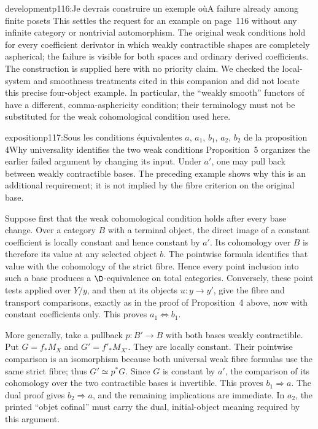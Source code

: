 \begin{dcomment}{development}{p116:Je devrais construire un exemple où}{A failure already among finite posets}
This settles the request for an example on page~116 without any infinite category or nontrivial automorphism. The original weak conditions hold for every coefficient derivator in which weakly contractible shapes are completely aspherical; the failure is visible for both spaces and ordinary derived coefficients. The construction is supplied here with no priority claim. We checked the local-system and smoothness treatments cited in this companion and did not locate this precise four-object example. In particular, the ``weakly smooth'' functors of \citet[Definition~4.1 and Proposition~4.3]{Maltsiniotis2005Asphericite} have a different, comma-asphericity condition; their terminology must not be substituted for the weak cohomological condition used here.
\end{dcomment}

\begin{dcomment}{exposition}{p117:Sous les conditions équivalentes $a$, $a_1$, $b_1$, $a_2$, $b_2$ de la proposition 4}{Why universality identifies the two weak conditions}
Proposition~5 organizes the earlier failed argument by changing its input. Under $a'$, one may pull back between weakly contractible bases. The preceding example shows why this is an additional requirement; it is not implied by the fibre criterion on the original base.

Suppose first that the weak cohomological condition holds after every base change. Over a category $B$ with a terminal object, the direct image of a constant coefficient is locally constant and hence constant by $a'$. Its cohomology over $B$ is therefore its value at any selected object $b$. The pointwise formula identifies that value with the cohomology of the strict fibre. Hence every point inclusion into such a base produces a $\D$-equivalence on total categories. Conversely, these point tests applied over $Y/y$, and then at its objects $u:y\to y'$, give the fibre and transport comparisons, exactly as in the proof of Proposition~4 above, now with constant coefficients only. This proves $a_1\Leftrightarrow b_1$.

More generally, take a pullback $p:B'\to B$ with both bases weakly contractible. Put $G=f_*M_X$ and $G'=f'_*M_{X'}$. They are locally constant. Their pointwise comparison is an isomorphism because both universal weak fibre formulas use the same strict fibre; thus $G'\simeq p^*G$. Since $G$ is constant by $a'$, the comparison of its cohomology over the two contractible bases is invertible. This proves $b_1\Rightarrow a$. The dual proof gives $b_2\Rightarrow a$, and the remaining implications are immediate. In $a_2$, the printed ``objet cofinal'' must carry the dual, initial-object meaning required by this argument.


\end{dcomment}
